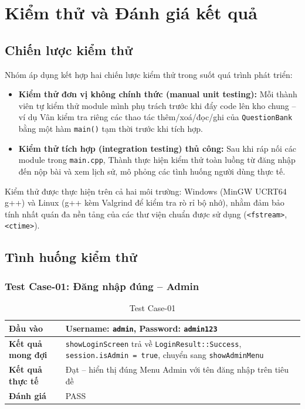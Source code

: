\documentclass[11pt]{report}
\begin{document}
\chapter{Kiểm thử và Đánh giá kết quả}
\label{chap:kiemthu}

\section{Chiến lược kiểm thử}

Nhóm áp dụng kết hợp hai chiến lược kiểm thử trong suốt quá trình phát triển:

\begin{itemize}[leftmargin=*]
    \item \textbf{Kiểm thử đơn vị không chính thức (manual unit testing):} Mỗi thành viên tự kiểm thử module mình phụ trách trước khi đẩy code lên kho chung -- ví dụ Vân kiểm tra riêng các thao tác thêm/xoá/đọc/ghi của \texttt{QuestionBank} bằng một hàm \texttt{main()} tạm thời trước khi tích hợp.
    \item \textbf{Kiểm thử tích hợp (integration testing) thủ công:} Sau khi ráp nối các module trong \texttt{main.cpp}, Thành thực hiện kiểm thử toàn luồng từ đăng nhập đến nộp bài và xem lịch sử, mô phỏng các tình huống người dùng thực tế.
\end{itemize}

Kiểm thử được thực hiện trên cả hai môi trường: Windows (MinGW UCRT64 g++) và Linux (g++ kèm Valgrind để kiểm tra rò rỉ bộ nhớ), nhằm đảm bảo tính nhất quán đa nền tảng của các thư viện chuẩn được sử dụng (\texttt{<fstream>}, \texttt{<ctime>}).

\section{Tình huống kiểm thử}

\subsection{Test Case-01: Đăng nhập đúng -- Admin}

\begin{table}[H]
    \centering
    \begin{tabularx}{\textwidth}{|l|>{\raggedright\arraybackslash}X|} \hline
        \textbf{Đầu vào} & Username: \texttt{admin}, Password: \texttt{admin123} \\ \hline
        \textbf{Kết quả mong đợi} & \texttt{showLoginScreen} trả về \texttt{LoginResult::Success}, \texttt{session.isAdmin = true}, chuyển sang \texttt{showAdminMenu} \\ \hline
        \textbf{Kết quả thực tế} & Đạt -- hiển thị đúng Menu Admin với tên đăng nhập trên tiêu đề \\ \hline
        \textbf{Đánh giá} & PASS \\ \hline
    \end{tabularx}
    \caption{Test Case-01}
\end{table}
\end{document}
